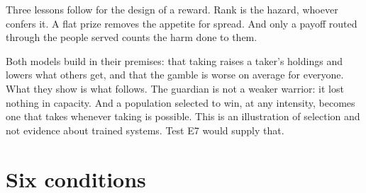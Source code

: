 \documentclass[10pt,twocolumn]{article}
\theoremstyle{plain}
\theoremstyle{definition}
\begin{document}
Three lessons follow for the design of a reward. Rank is the hazard, whoever confers it. A
flat prize removes the appetite for spread. And only a payoff routed through the people
served counts the harm done to them.

Both models build in their premises: that taking raises a taker's holdings and lowers what
others get, and that the gamble is worse on average for everyone. What they show is what
follows. The guardian is not a weaker warrior: it lost nothing in
capacity. And a population selected to win, at any intensity, becomes one that takes
whenever taking is possible. This is an illustration of selection and not evidence about
trained systems. Test E7 would supply that.

\section{Six conditions}\label{sec:conditions}
\end{document}
